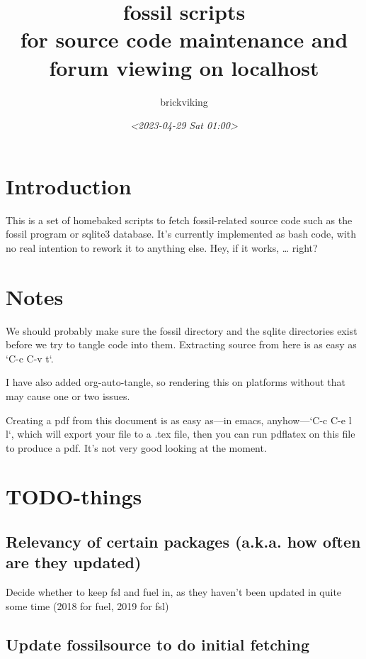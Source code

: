 \documentclass[11pt]{article}
\author{brickviking}
\date{\textit{<2023-04-29 Sat 01:00>}}
\title{fossil scripts\\\medskip
\large for source code maintenance and forum viewing on localhost}
\begin{document}
\maketitle
\setcounter{tocdepth}{2}
\tableofcontents



\section*{Introduction}
\label{sec:orgbfeddb6}

This is a set of homebaked scripts to fetch fossil-related source code such as the fossil program or
sqlite3 database. It's currently implemented as bash code, with no real intention to rework it to
anything else. Hey, if it works, \ldots{} right?

\section*{Notes}
\label{sec:orgcef4552}

We should probably make sure the fossil directory and the sqlite directories exist before we try to
tangle code into them. Extracting source from here is as easy as `C-c C-v t`.

I have also added org-auto-tangle, so rendering this on platforms without that may cause one or two
issues.

Creating a pdf from this document is as easy as—in emacs, anyhow—`C-c C-e l l`, which will export
your file to a .tex file, then you can run pdflatex on this file to produce a pdf. It's not very
good looking at the moment.

\section*{TODO-things}
\label{sec:orgb7e1679}

\subsection*{Relevancy of certain packages (a.k.a. how often are they updated)}
\label{sec:orge96ff60}

Decide whether to keep fsl and fuel in, as they haven't been updated in quite some time (2018 for fuel,
2019 for fsl)

\subsection*{Update fossilsource to do initial fetching}
\label{sec:orgec45382}
\end{document}
